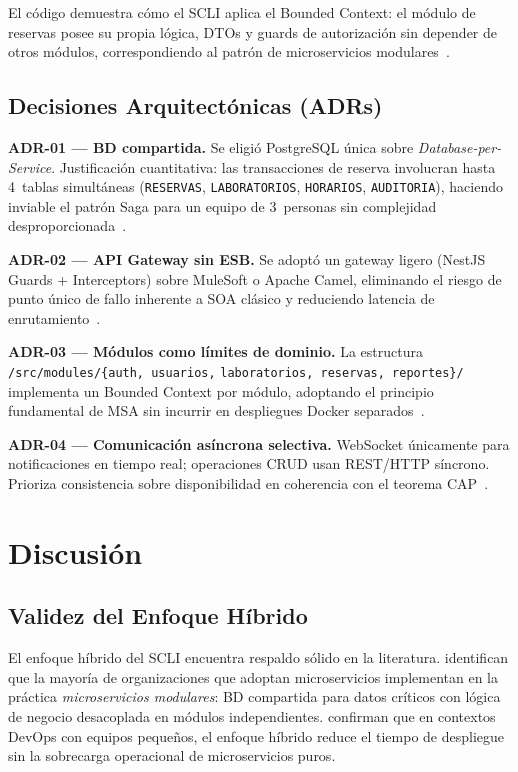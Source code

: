 \documentclass[conference,a4paper]{IEEEtran}
\begin{document}
El c\'odigo demuestra c\'omo el SCLI aplica el Bounded Context:
el m\'odulo de reservas posee su propia l\'ogica, DTOs y guards
de autorizaci\'on sin depender de otros m\'odulos, correspondiendo
al patr\'on de microservicios modulares~\cite{velepucha2023}.

\subsection{Decisiones Arquitect\'onicas (ADRs)}

\textbf{ADR-01 --- BD compartida.} Se eligi\'o PostgreSQL
\'unica sobre \textit{Database-per-Service}. Justificaci\'on
cuantitativa: las transacciones de reserva involucran hasta
4~tablas simult\'aneas (\texttt{RESERVAS}, \texttt{LABORATORIOS},
\texttt{HORARIOS}, \texttt{AUDITORIA}), haciendo inviable el
patr\'on Saga para un equipo de 3~personas sin complejidad
desproporcionada~\cite{velepucha2023}.

\textbf{ADR-02 --- API Gateway sin ESB.} Se adopt\'o un
gateway ligero (NestJS Guards + Interceptors) sobre MuleSoft
o Apache Camel, eliminando el riesgo de punto \'unico de
fallo inherente a SOA cl\'asico y reduciendo latencia de
enrutamiento~\cite{aksakalli2021}.

\textbf{ADR-03 --- M\'odulos como l\'imites de dominio.}
La estructura \texttt{/src/modules/\{auth, usuarios,}
\texttt{laboratorios, reservas, reportes\}/} implementa
un Bounded Context por m\'odulo, adoptando el principio
fundamental de MSA sin incurrir en despliegues Docker
separados~\cite{waseem2021}.

\textbf{ADR-04 --- Comunicaci\'on as\'incrona selectiva.}
WebSocket \'unicamente para notificaciones en tiempo real;
operaciones CRUD usan REST/HTTP s\'incrono. Prioriza
consistencia sobre disponibilidad en coherencia con el
teorema CAP~\cite{newman2021}.

\section{Discusi\'on}
\label{sec:discusion}

\subsection{Validez del Enfoque H\'ibrido}

El enfoque h\'ibrido del SCLI encuentra respaldo s\'olido en la
literatura. \textcite{velepucha2023} identifican que la mayor\'ia
de organizaciones que adoptan microservicios implementan en la
pr\'actica \textit{microservicios modulares}: BD compartida para
datos cr\'iticos con l\'ogica de negocio desacoplada en m\'odulos
independientes. \textcite{waseem2021} confirman que en contextos
DevOps con equipos peque\~nos, el enfoque h\'ibrido reduce el
tiempo de despliegue sin la sobrecarga operacional de
microservicios puros.
\end{document}
